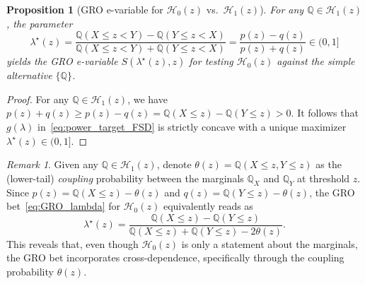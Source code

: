 \documentclass[12pt,twoside]{article}
\theoremstyle{plain}
\newtheorem{proposition}{Proposition}
\theoremstyle{definition}
\theoremstyle{remark}
\newtheorem{remark}{Remark}
\newcommand{\calH}{\mathcal{H}}
\newcommand{\Qsymb}{\mathbb{Q}}
\begin{document}
\begin{proposition}[GRO e-variable for $\calH_0(z)$ vs.\ $\calH_1(z)$]\label{ppn:GRO_betting_parameter_FSD}
    For any $\Qsymb \in \calH_1(z)$, the parameter
    \begin{equation}\label{eq:GRO_lambda}
        \lambda^\star(z) 
    = \frac{\Qsymb(X \leq z < Y) - \Qsymb(Y \leq z < X)}{\Qsymb(X \leq z < Y) + \Qsymb(Y \leq z < X)} 
    = \frac{p(z)-q(z)}{p(z)+q(z)}\in (0,1]
    \end{equation}
    yields the GRO e-variable $S(\lambda^\star(z), z)$ for testing $\calH_0(z)$ against the simple alternative $\{\Qsymb\}$. 
\end{proposition}
\begin{proof} 
   For any $\Qsymb \in \calH_1(z)$, we have $p(z)+q(z)\geq p(z)-q(z) = \Qsymb(X\leq z) - \Qsymb(Y\leq z) >0$. It follows that $g(\lambda)$ in~\eqref{eq:power_target_FSD} is strictly concave with a unique maximizer $ \lambda^\star(z) \in (0,1]$.
\end{proof}

\begin{remark}
    Given any $\Qsymb \in \calH_1(z)$, denote $\theta(z) = \Qsymb(X \leq z, Y \leq z)$ as the (lower-tail) \emph{coupling} probability between the marginals $\Qsymb_X$ and $\Qsymb_Y$ at threshold $z$. 
    Since $p(z) = \Qsymb(X \leq z) - \theta(z)$ and $q(z) = \Qsymb(Y \leq z) - \theta(z)$, the GRO bet~\eqref{eq:GRO_lambda} for $\calH_0(z)$ equivalently reads as
    \begin{equation*}
        \lambda^\star(z) = \frac{\Qsymb(X \leq z) - \Qsymb(Y \leq z)}{\Qsymb(X \leq z) + \Qsymb(Y \leq z) - 2\theta(z)}. 
    \end{equation*}
    This reveals that, even though $\calH_0(z)$ is only a statement about the marginals, the GRO bet incorporates cross-dependence, specifically through the coupling probability $\theta(z)$.
\end{remark}
\end{document}
